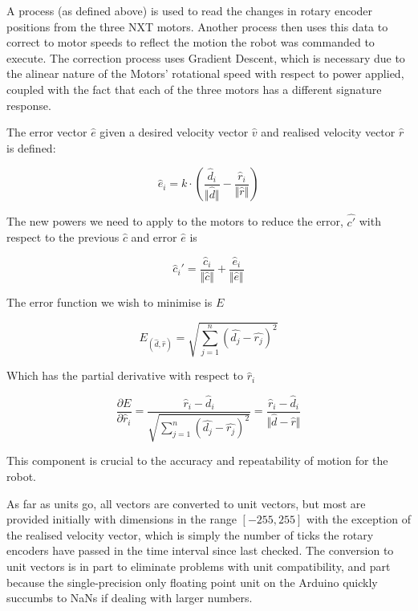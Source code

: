 A process (as defined above) is used to read the changes in rotary encoder positions from the three NXT motors. Another process then uses this data to correct to motor speeds to reflect the motion the robot was commanded to execute. The correction process uses Gradient Descent, which is necessary due to the alinear nature of the Motors' rotational speed with respect to power applied, coupled with the fact that each of the three motors has a different signature response.

The error vector $\hat{e}$ given a desired velocity vector $\hat{v}$ and realised velocity vector $\hat{r}$ is defined:

\begin{equation}
  \hat{e}_i = k \cdot \left(\frac{\hat{d}_i}{\Vert\hat{d}\Vert} - \frac{\hat{r}_i}{\Vert\hat{r}\Vert}\right)
\end{equation}

The new powers we need to apply to the motors to reduce the error, $\hat{c'}$ with respect to the previous $\hat{c}$ and error $\hat{e}$ is

\begin{equation}
  \hat{c}_i' = \frac{ \hat{c}_i }{\Vert\hat{c}\Vert} + \frac{ \hat{e}_i }{\Vert\hat{e}\Vert}
\end{equation}

The error function we wish to minimise is $E$

\begin{equation}
  E_{(\hat{d},\hat{r})} = \sqrt{\sum_{j=1}^{n} (\hat{d_j} - \hat{r_j})^2}
\end{equation}

Which has the partial derivative with respect to $\hat{r}_i$

\begin{equation}
  \frac{\partial E}{\partial \hat{r}_i}
  =
  \frac{\hat{r}_i - \hat{d}_i}{\sqrt{\sum_{j=1}^{n} (\hat{d_j} - \hat{r_j})^2}}
  =
  \frac{\hat{r}_i - \hat{d}_i}{\Vert\hat{d}-\hat{r}\Vert}
\end{equation}

This component is crucial to the accuracy and repeatability of motion for the robot.

As far as units go, all vectors are converted to unit vectors, but most are provided initially with dimensions in the range $[-255,255]$ with the exception of the realised velocity vector, which is simply the number of ticks the rotary encoders have passed in the time interval since last checked. The conversion to unit vectors is in part to eliminate problems with unit compatibility, and part because the single-precision only floating point unit on the Arduino quickly succumbs to NaNs if dealing with larger numbers.

